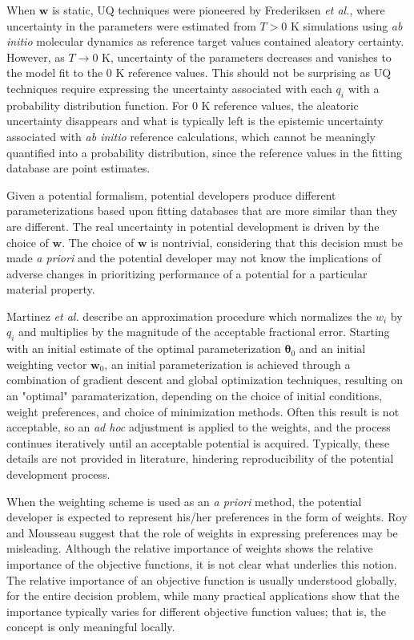 When $\bm{w}$ is static, UQ techniques were pioneered by Frederiksen \emph{et al.}\cite{frederiksen2004_md_bayes}, where uncertainty in the parameters were estimated from $T > 0$ K simulations using \emph{ab initio} molecular dynamics as reference target values contained aleatory certainty.  However, as $T \rightarrow 0 $ K, uncertainty of the parameters decreases and vanishes to the model fit to the $0$ K reference values.  This should not be surprising as UQ techniques require expressing the uncertainty associated with each $q_i$ with a probability distribution function.  For $0$ K reference values, the aleatoric uncertainty disappears and what is typically left is the epistemic uncertainty associated with \emph{ab initio} reference calculations, which cannot be meaningly quantified into a probability distribution, since the reference values in the fitting database are point estimates.

Given a potential formalism, potential developers produce different parameterizations based upon fitting databases that are more similar than they are different.  The real uncertainty in potential development is driven by the choice of $\bm{w}$.  The choice of $\bm{w}$ is nontrivial, considering that this decision must be made \emph{a priori} and the potential developer may not know the implications of adverse changes in prioritizing performance of a potential for a particular material property.

Martinez \emph{et al.}\cite{martinez2013_fitting,martinez2016_posmat} describe an approximation procedure which normalizes the $w_i$ by $q_i$ and multiplies by the magnitude of the acceptable fractional error.  Starting with an initial estimate of the optimal parameterization $\bm{\theta}_0$ and an initial weighting vector $\bm{w}_0$, an initial parameterization is achieved through a combination of gradient descent and global optimization techniques, resulting on an "optimal" paramaterization, depending on the choice of initial conditions, weight preferences, and choice of minimization methods.  Often this result is not acceptable, so an \emph{ad hoc} adjustment is applied to the weights, and the process continues iteratively until an acceptable potential is acquired.  Typically, these details are not provided in literature, hindering reproducibility of the potential development process.

When the weighting scheme is used as an \emph{a priori} method, the potential developer is expected to represent his/her preferences in the form of weights.  Roy and Mousseau\cite{roy1996_moo_weights} suggest that the role of weights in expressing preferences may be misleading.  Although the relative importance of weights shows the relative importance of the objective functions, it is not clear what underlies this notion.  The relative importance of an objective function is usually understood globally, for the entire decision problem, while many practical applications show that the importance typically varies for different objective function values; that is, the concept is only meaningful locally\cite{podinovski2002_moo_weights}.

